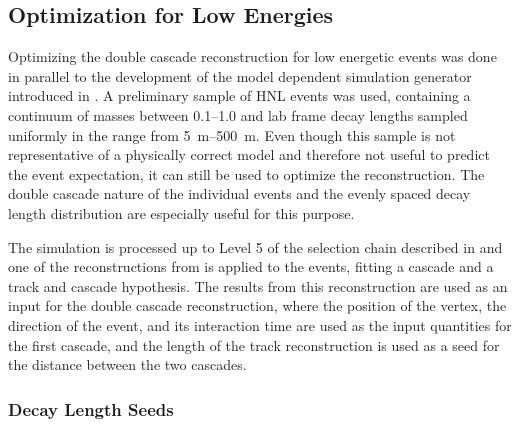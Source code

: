 \subsection{Optimization for Low Energies}

Optimizing the double cascade reconstruction for low energetic events was done in parallel to the development of the model dependent simulation generator introduced in . A preliminary sample of HNL events was used, containing a continuum of masses between \SIrange[range-phrase=~and~]{0.1}{1.0}{\gev} and lab frame decay lengths sampled uniformly in the range from \SIrange{5}{500}{\meter}. Even though this sample is not representative of a physically correct model and therefore not useful to predict the event expectation, it can still be used to optimize the reconstruction. The double cascade nature of the individual events and the evenly spaced decay length distribution are especially useful for this purpose.

The simulation is processed up to Level 5 of the selection chain described in  and one of the reconstructions from  is applied to the events, fitting a cascade and a track and cascade hypothesis. The results from this reconstruction are used as an input for the double cascade reconstruction, where the position of the vertex, the direction of the event, and its interaction time are used as the input quantities for the first cascade, and the length of the track reconstruction is used as a seed for the distance between the two cascades.


\subsubsection{Decay Length Seeds}

